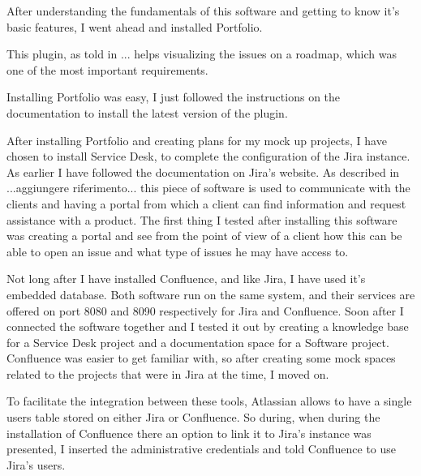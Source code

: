	
	After understanding the fundamentals of this software and getting to know it's basic features, I went ahead and installed Portfolio.
	
	This plugin, as told in ... helps visualizing the issues on a roadmap, which was one of the most important requirements.
	
	Installing Portfolio was easy, I just followed the instructions on the documentation to install the latest version of the plugin.
	
	
	After installing Portfolio and creating plans for my mock up projects, I have chosen to install Service Desk, to complete the configuration of the Jira instance.
	As earlier I have followed the documentation on Jira's website.
	As described in ...aggiungere riferimento... this piece of software is used to communicate with the clients and having a portal from which a client can find information and request assistance with a product.
	The first thing I tested after installing this software was creating a portal and see from the point of view of a client how this can be able to open an issue and what type of issues he may have access to.
	
	
	Not long after I have installed Confluence, and like Jira, I have used it's embedded database.
	Both software run on the same system, and their services are offered on port 8080 and 8090 respectively for Jira and Confluence.
	Soon after I connected the software together and I tested it out by creating a knowledge base for a Service Desk project and a documentation space for a Software project.
	Confluence was easier to get familiar with, so after creating some mock spaces related to the projects that were in Jira at the time, I moved on.
	
	To facilitate the integration between these tools, Atlassian allows to have a single users table stored on either Jira or Confluence.
	So during, when during the installation of Confluence there an option to link it to Jira's instance was presented, I inserted the administrative credentials and told Confluence to use Jira's users.
	
